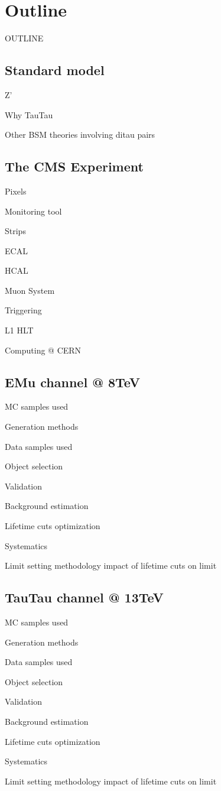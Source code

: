\chapter{Outline}
\label{introchap}


OUTLINE

\section{Standard model}

Z' 

Why TauTau

Other BSM theories involving ditau pairs


\section{The CMS Experiment}

Pixels

	Monitoring tool

Strips

ECAL

HCAL

Muon System

Triggering

	L1
	HLT
	
Computing @ CERN	

\section{EMu channel @ 8TeV}

MC samples used

	Generation methods
	
Data samples used

Object selection

Validation

Background estimation

Lifetime cuts
	optimization 
	
Systematics

Limit setting methodology
	impact of lifetime cuts on limit
	
\section{TauTau channel @ 13TeV}

MC samples used

	Generation methods
	
Data samples used

Object selection

Validation

Background estimation

Lifetime cuts
	optimization 
	
Systematics

Limit setting methodology
	impact of lifetime cuts on limit















